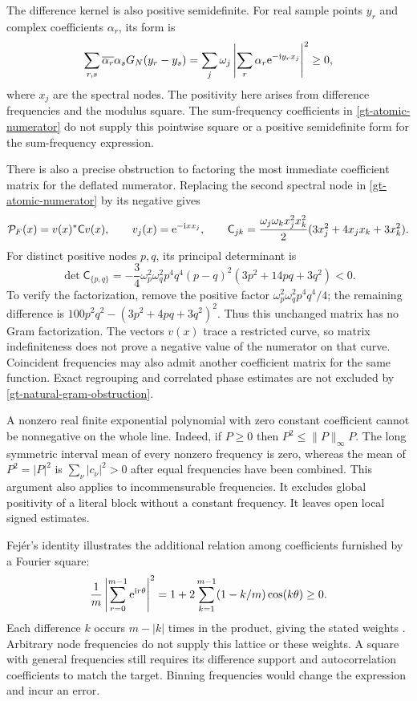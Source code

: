 The difference kernel is also positive semidefinite. For real sample
points \(y_r\) and complex coefficients \(\alpha_r\), its form is
\[
 \sum_{r,s}\overline{\alpha_r}\alpha_s G_N(y_r-y_s)
    =\sum_j\omega_j\left|
          \sum_r\alpha_r\mathrm e^{-\mathrm i y_r x_j}\right|^2\ge0,
\]
where \(x_j\) are the spectral nodes. The positivity here arises from
difference frequencies and the modulus square. The sum-frequency coefficients in
\eqref{gt-atomic-numerator} do not supply this pointwise square or a
positive semidefinite form for the sum-frequency expression.

There is also a precise obstruction to factoring the most immediate
coefficient matrix for the deflated numerator. Replacing the second
spectral node in \eqref{gt-atomic-numerator} by its negative gives
\[
 \mathcal P_F(x)=v(x)^*\mathsf C v(x),\qquad
 v_j(x)=\mathrm e^{-\mathrm i x x_j},\qquad
 \mathsf C_{jk}=\frac{\omega_j\omega_kx_j^2x_k^2}{2}
                  (3x_j^2+4x_jx_k+3x_k^2).
\]
For distinct positive nodes \(p,q\), its principal determinant is
\begin{equation}
 \det\mathsf C_{\{p,q\}}
 =-\frac34\omega_p^2\omega_q^2p^4q^4
       (p-q)^2(3p^2+14pq+3q^2)<0.
 \label{gt-natural-gram-obstruction}
\end{equation}
To verify the factorization, remove the positive factor
\(\omega_p^2\omega_q^2p^4q^4/4\); the remaining difference is
\(100p^2q^2-(3p^2+4pq+3q^2)^2\).
Thus this unchanged matrix has no Gram factorization. The vectors
\(v(x)\) trace a restricted curve, so matrix indefiniteness does not
prove a negative value of the numerator on that curve. Coincident
frequencies may also admit another coefficient matrix for the same
function. Exact regrouping and correlated phase estimates are not
excluded by \eqref{gt-natural-gram-obstruction}.

A nonzero real finite exponential polynomial with zero constant
coefficient cannot be nonnegative on the whole line. Indeed, if
\(P\ge0\) then \(P^2\le\|P\|_\infty P\). The long symmetric interval
mean of every nonzero frequency is zero, whereas the mean of
\(P^2=|P|^2\) is \(\sum_\nu|c_\nu|^2>0\) after equal frequencies
have been combined. This argument also applies to incommensurable
frequencies. It excludes global positivity of a literal block
without a constant frequency. It leaves open local signed estimates.

Fej\'er's identity illustrates the additional relation among
coefficients furnished by a Fourier square:
\[
 \frac1m\left|\sum_{r=0}^{m-1}\mathrm e^{\mathrm i r\theta}\right|^2
   =1+2\sum_{k=1}^{m-1}(1-k/m)\cos(k\theta)\ge0.
\]
Each difference \(k\) occurs \(m-|k|\) times in the product, giving
the stated weights \cite[Eq.~1.15.15]{dlmf}. Arbitrary node
frequencies do not supply this lattice or these weights.
A square with general frequencies still requires its difference
support and autocorrelation coefficients to match the target.
Binning frequencies would change the expression and incur an error.


